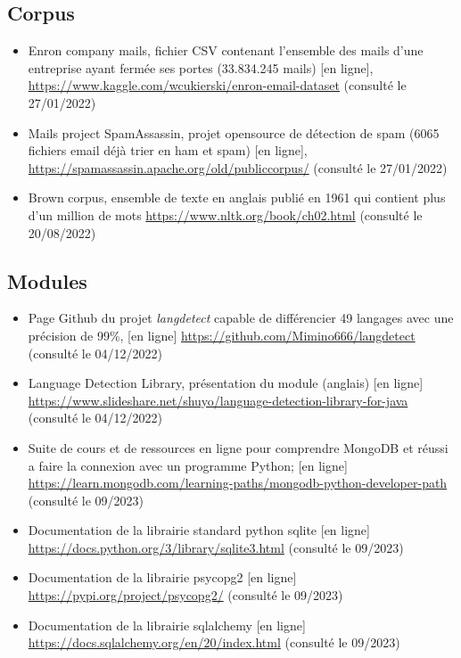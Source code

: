 \documentclass[a4paper,12pt]{article}
\begin{document}
		\subsection{Corpus}
			\begin{itemize}
				\item Enron company mails, fichier CSV contenant l'ensemble des mails d'une entreprise ayant fermée ses portes (33.834.245 mails) [en ligne], \url{https://www.kaggle.com/wcukierski/enron-email-dataset} (consulté le 27/01/2022) \label{Enron_dataset}
				\item Mails project SpamAssassin, projet opensource de détection de spam (6065 fichiers email déjà trier en ham et spam) [en ligne], \url{https://spamassassin.apache.org/old/publiccorpus/} (consulté le 27/01/2022) \label{SpamAssassin_dataset}
				\item Brown corpus, ensemble de texte en anglais publié en 1961 qui contient plus d'un million de mots \url{https://www.nltk.org/book/ch02.html} (consulté le 20/08/2022) \label{Brown_corpus}
			\end{itemize}
		
		\subsection{Modules}
			\begin{itemize}
				\item Page Github du projet \emph{langdetect} capable de différencier 49 langages avec une précision de 99\%, [en ligne] \url{https://github.com/Mimino666/langdetect} (consulté le 04/12/2022) \label{langdetect}
				\item Language Detection Library, présentation du module (anglais) [en ligne] \url{https://www.slideshare.net/shuyo/language-detection-library-for-java} (consulté le 04/12/2022)
				\item Suite de cours et de ressources en ligne pour comprendre MongoDB et réussi a faire la connexion avec un programme Python; [en ligne] \url{https://learn.mongodb.com/learning-paths/mongodb-python-developer-path} (consulté le 09/2023)
				\item Documentation de la librairie standard python sqlite [en ligne] \url{https://docs.python.org/3/library/sqlite3.html} (consulté le 09/2023)
				\item Documentation de la librairie psycopg2 [en ligne] \url{https://pypi.org/project/psycopg2/} (consulté le 09/2023)
				\item Documentation de la librairie sqlalchemy [en ligne] \url{https://docs.sqlalchemy.org/en/20/index.html} (consulté le 09/2023)
			\end{itemize}
			
\end{document}
